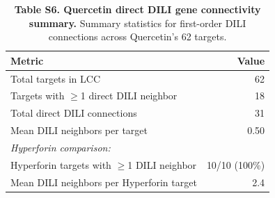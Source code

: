 \begin{table}[ht]
\centering
\caption{\textbf{Table S5. Direct DILI gene connectivity.}
Hyperforin targets with first-order (distance = 1) connections to DILI genes in the STRING network ($\geq$900).
DILI neighbors are genes present in the 82-gene DILI set.}
\label{tab:S5}
\vspace{0.5em}
\end{table}

\begin{table}[ht]
\centering
\caption{\textbf{Table S6. Quercetin direct DILI gene connectivity summary.}
Summary statistics for first-order DILI connections across Quercetin's 62 targets.}
\label{tab:S6}
\vspace{0.5em}
\begin{tabular}{lr}
\toprule
\textbf{Metric} & \textbf{Value} \\
\midrule
Total targets in LCC & 62 \\
Targets with $\geq$1 direct DILI neighbor & 18 \\
Total direct DILI connections & 31 \\
Mean DILI neighbors per target & 0.50 \\
\addlinespace
\textit{Hyperforin comparison:} & \\
Hyperforin targets with $\geq$1 DILI neighbor & 10/10 (100\%) \\
Mean DILI neighbors per Hyperforin target & 2.4 \\
\bottomrule
\end{tabular}
\end{table}

